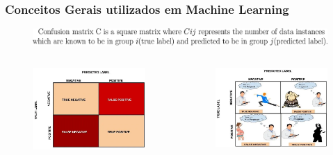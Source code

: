 \documentclass{beamer}
\begin{document}
\begin{frame}
	\frametitle{Conceitos Gerais utilizados em Machine Learning}
		\begin{figure}
			\centering
			\includegraphics[width=0.7\linewidth]{figures/cij}
		\end{figure}
		\begin{columns}
			\begin{column}{0.4\textwidth}
				\begin{figure}
					\centering
					\includegraphics[width=1\linewidth]{figures/confusion_matrix}
				\end{figure}
				
			\end{column}
			\begin{column}{0.4\textwidth}
				\begin{figure}
					\centering
					\includegraphics[width=1\linewidth]{figures/confusion_matrix1}
				\end{figure}
			\end{column}
		\end{columns}
\end{frame}
\end{document}
